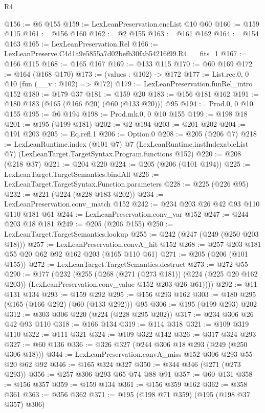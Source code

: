 \begin{lexlean}{R4}
\begin{coremodule}
@156 := @6 @155
@159 := LexLeanPreservation.encList @10 @60
@160 := @159 @115
@161 := @156 @160
@162 := @2 @155
@163 := @161 @162
@164 := @154 @163
@165 := LexLeanPreservation.Rel
@166 := LexLeanPreserve.C4d1a9e5855a7d02befb30fab54216f99.R4.__fits_1
@167 := @166 @115
@168 := @165 @167
@169 := @133 @115
@170 := @60 @169
@172 := @164 (@168 @170)
@173 := (values : @102) -> @172
@177 := List.rec.{0, 0} @10 (fun (__v : @102) => @172)
@179 := LexLeanPreservation.funRel_intro @152
@180 := @179 @37
@181 := @159 @20
@183 := @156 @181 @162
@191 := @180 @183 (@165 (@166 @20) (@60 (@133 @20))) @95
@194 := Prod.{0, 0} @10 @155
@195 := @6 @194
@198 := Prod.mk.{0, 0} @10 @155
@199 := @198 @18
@201 := @195 (@199 @181)
@202 := @2 @194
@203 := @201 @202
@204 := @191 @203
@205 := Eq.refl.{1}
@206 := Option.{0}
@208 := @205 (@206 @7)
@218 := LexLeanRuntime.index
    (@101 @7)
    @7
    (LexLeanRuntime.instIndexableList @7)
    (LexLeanTarget.TargetSyntax.Program.functions @152)
@220 := @208 (@218 @37)
@221 := @204 @220
@224 := @205 (@206 (@101 @194))
@225 := LexLeanTarget.TargetSemantics.bindAll
@226 := LexLeanTarget.TargetSyntax.Function.parameters
@228 := @225 (@226 @95)
@232 := @221 (@224 (@228 @183 @202))
@234 := LexLeanPreservation.conv_match @152
@242 := @234 @203 @26 @42 @93 @110 @110 @181 @61
@244 := LexLeanPreservation.conv_var @152
@247 := @244 @203 @18 @181
@249 := @205 (@206 @155)
@250 := LexLeanTarget.TargetSemantics.lookup
@255 := @242 (@247 (@249 (@250 @203 @18)))
@257 := LexLeanPreservation.convA_hit @152
@268 := @257 @203 @181 @55 @20 @62 @92 @162 @203 (@165 @110 @61)
@271 := @205 (@206 (@101 @155))
@272 := LexLeanTarget.TargetSemantics.destruct
@273 := @272 @55
@290 := @177
    (@232
      (@255
        (@268
          (@271 (@273 @181))
          (@224 (@225 @20 @162 @203))
          (LexLeanPreservation.conv_value @152 @203 @26 @61))))
@292 := @11 @131 @134
@293 := @159 @292
@295 := @156 @293 @162
@303 := @180 @295 (@165 (@166 @292) (@60 (@133 @292))) @95
@306 := @195 (@199 @293) @202
@312 := @303 @306 @220 (@224 (@228 @295 @202))
@317 := @234 @306 @26 @42 @93 @110
@318 := @166 @134
@319 := @114 @318
@321 := @109 @319 @110
@322 := @111 @321
@324 := @109 @322 @142
@326 := @317 @324 @293
@327 := @60 @136
@336 := @326 @327 (@244 @306 @18 @293 (@249 (@250 @306 @18)))
@344 := LexLeanPreservation.convA_miss @152 @306 @293 @55 @20 @62 @92
@346 := @165 @324 @327
@350 := @344 @346 (@271 (@273 @293))
@356 := @257 @306 @293 @65 @74 @88 @91
@357 := @60 @131
@358 := @156 @357
@359 := @159 @134
@361 := @156 @359 @162
@362 := @358 @361
@363 := @356 @362
@371 := @195 (@198 @71 @359) (@195 (@198 @37 @357) @306)

\end{coremodule}
\end{lexlean}
